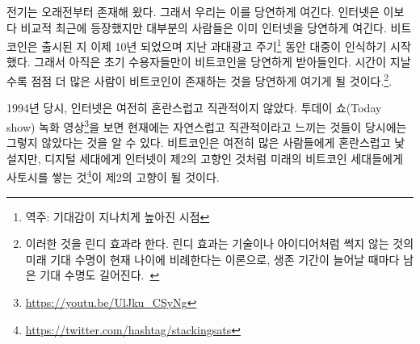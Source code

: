 \begin{comment}
	Electricity has been around for a while now. We take it for granted. The
	internet is quite a bit younger, but most people already take it for
	granted as well. Bitcoin is ten years old and has entered public
	consciousness during the last hype cycle. Only the earliest of adopters
	take it for granted. As more time passes, more and more people will
	recognize Bitcoin as something which simply is.\footnote{This is known as the
		\textit{Lindy Effect}. The Lindy effect is a theory that the future life expectancy
		of some non-perishable things like a technology or an idea is proportional to
		their current age, so that every additional period of survival implies a longer
		remaining life expectancy.~\cite{wiki:lindy}}
\end{comment}
전기는 오래전부터 존재해 왔다. 그래서 우리는 이를 당연하게 여긴다.
인터넷은 이보다 비교적 최근에 등장했지만 대부분의 사람들은 이미 인터넷을 당연하게 여긴다.
비트코인은 출시된 지 이제 10년 되었으며 지난 과대광고 주기\footnote{역주: 기대감이 지나치게 높아진 시점} 동안 대중이 인식하기 시작했다.
그래서 아직은 초기 수용자들만이 비트코인을 당연하게 받아들인다.
시간이 지날수록 점점 더 많은 사람이 비트코인이 존재하는 것을 당연하게 여기게 될 것이다.\footnote{이러한 것을
	린디 효과라 한다. 린디 효과는 기술이나 아이디어처럼 썩지 않는 것의 미래 기대 수명이 현재 나이에 비례한다는 이론으로,
	생존 기간이 늘어날 때마다 남은 기대 수명도 길어진다.~\cite{wiki:lindy}}.

\begin{comment}
	In 1994, the internet was still confusing and unintuitive. Watching this old
	recording of the \textit{Today
		Show}\footnote{\url{https://youtu.be/UlJku_CSyNg}} makes it obvious that what
	feels natural and intuitive now actually wasn't back then. Bitcoin is still
	confusing and alien to most, but just like the internet is second nature for
	digital natives, spending and stacking
	sats\footnote{\url{https://twitter.com/hashtag/stackingsats}} will be second
	nature to the bitcoin natives of the future.
\end{comment}
1994년 당시, 인터넷은 여전히 혼란스럽고 직관적이지 않았다. 
투데이 쇼(Today show) 녹화 영상\footnote{\url{https://youtu.be/UlJku_CSyNg}}을 보면 
현재에는 자연스럽고 직관적이라고 느끼는 것들이 당시에는 그렇지 않았다는 것을 알 수 있다.
비트코인은 여전히 많은 사람들에게 혼란스럽고 낯설지만, 
디지털 세대에게 인터넷이 제2의 고향인 것처럼 
미래의 비트코인 세대들에게 사토시를 쌓는 것\footnote{\url{https://twitter.com/hashtag/stackingsats}}이 제2의 고향이 될 것이다.

